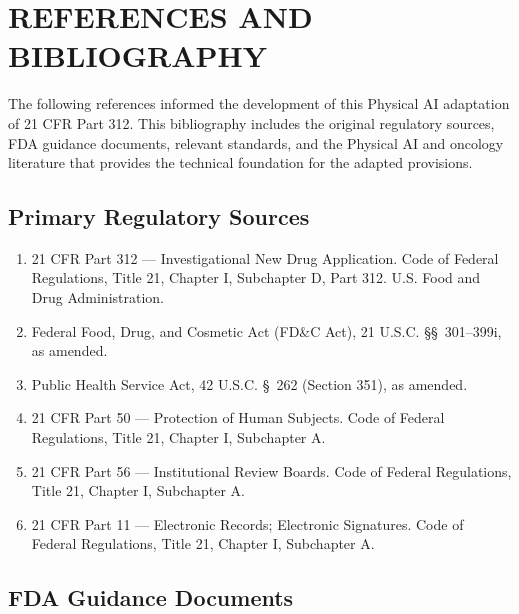 \clearpage

\section*{REFERENCES AND BIBLIOGRAPHY}


The following references informed the development of this Physical AI adaptation of 21 CFR Part 312. This bibliography includes the original regulatory sources, FDA guidance documents, relevant standards, and the Physical AI and oncology literature that provides the technical foundation for the adapted provisions.

\subsection*{Primary Regulatory Sources}

\begin{enumerate}
\item 21 CFR Part 312 --- Investigational New Drug Application. Code of Federal Regulations, Title 21, Chapter I, Subchapter D, Part 312. U.S. Food and Drug Administration.

\item Federal Food, Drug, and Cosmetic Act (FD\&C Act), 21 U.S.C. \S\S~301--399i, as amended.

\item Public Health Service Act, 42 U.S.C. \S~262 (Section 351), as amended.

\item 21 CFR Part 50 --- Protection of Human Subjects. Code of Federal Regulations, Title 21, Chapter I, Subchapter A.

\item 21 CFR Part 56 --- Institutional Review Boards. Code of Federal Regulations, Title 21, Chapter I, Subchapter A.

\item 21 CFR Part 11 --- Electronic Records; Electronic Signatures. Code of Federal Regulations, Title 21, Chapter I, Subchapter A.
\end{enumerate}

\subsection*{FDA Guidance Documents}

